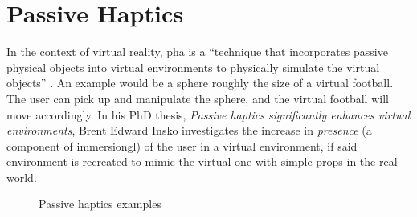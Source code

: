 \section{Passive Haptics}\label{section:passiveHaptics}

In the context of virtual reality, \gls{pha} is a \enquote{technique that incorporates passive physical objects into virtual environments to physically simulate the virtual objects} \autocite[p. ~9]{passiveHaptics}. An example would be a sphere roughly the size of a virtual football. The user can pick up and manipulate the sphere, and the virtual football will move accordingly. In his PhD thesis, \textit{Passive haptics significantly enhances virtual environments}, Brent Edward Insko investigates the increase in \textit{presence} (a component of \gls{immersiongl}) of the user in a virtual environment, if said environment is recreated to mimic the virtual one with simple props in the real world.
\newline

\begin{figure}[h]
    \centering
    \hfill
    \hfill
    \caption{Passive haptics examples}
    \label{fig:passiveHapticsPics}
\end{figure}


